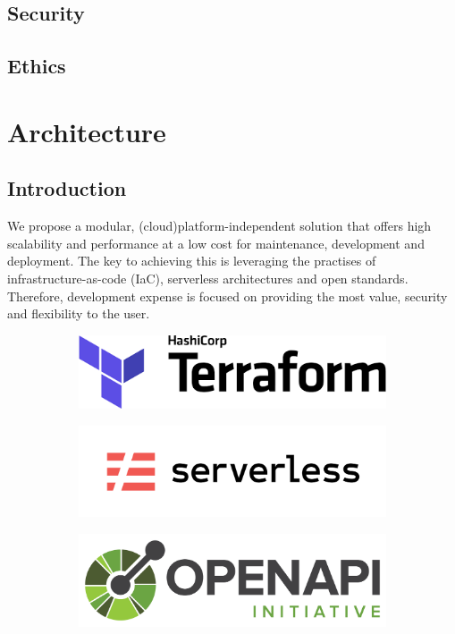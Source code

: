 \documentclass[10pt]{article}
\begin{document}
\subsection{Security}
\subsection{Ethics}

\newpage
\section{Architecture}
\subsection{Introduction}
We propose a modular, (cloud)platform-independent solution that offers high scalability and performance at a low cost for maintenance, development and deployment. The key to achieving this is leveraging the practises of infrastructure-as-code (IaC), serverless architectures and open standards. Therefore, development expense is focused on providing the most value, security and flexibility to the user.\\

\begin{figure}[h!]
	\centering
	\begin{subfigure}{0.25\linewidth}
		\includegraphics[width=\linewidth]{images/Terraform.png}
	\end{subfigure}
	\begin{subfigure}{0.25\linewidth}
		\includegraphics[width=\linewidth]{images/Serverless.png}
	\end{subfigure}
	\begin{subfigure}{0.25\linewidth}
		\includegraphics[width=\linewidth]{images/OpenAPI.png}
	\end{subfigure}
\end{figure}
\end{document}
